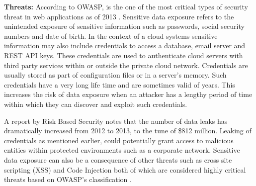 \documentclass[a4paper,twoside]{article}
\begin{document}




\textbf{Threats:}
According to OWASP,  is the one of the most critical types of security threat in web applications as of 2013 \cite{wichers_owasp_2014}. Sensitive data exposure refers to the unintended exposure of sensitive information such as passwords, social security numbers and date of birth. In the context of a cloud systems sensitive information may also include credentials to access a database, email server and REST API keys. These credentials are used to authenticate cloud servers with third party services within or outside the private cloud network. Credentials are usually stored as part of configuration files or in a server's memory. Such credentials have a very long life time and are sometimes valid of years. This increases the risk of data exposure when an attacker has a lengthy period of time within which they can discover and exploit such credentials.

A report by Risk Based Security \cite{risk_based_executives_2014} notes that the number of data leaks has dramatically increased from 2012 to 2013, to the tune of \$812 million. Leaking of credentials as mentioned earlier, could potentially grant access to malicious entities within protected environments such as a corporate network. Sensitive data exposure can also be a consequence of other threats such as cross site scripting (XSS) and Code Injection both of which are considered highly critical threats based on OWASP's classification \cite{wichers_owasp_2014}. 
\end{document}
